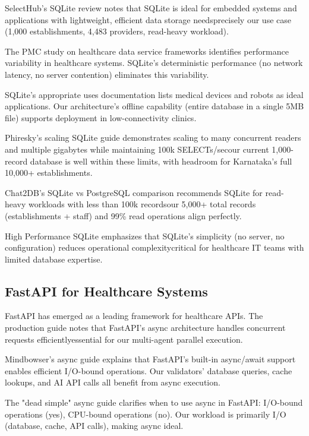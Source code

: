 \documentclass[conference]{IEEEtran}
\begin{document}
SelectHub's SQLite review \cite{selecthub2024sqlite} notes that SQLite is ideal for embedded systems and applications with lightweight, efficient data storage needsprecisely our use case (1,000 establishments, 4,483 providers, read-heavy workload).

The PMC study on healthcare data service frameworks \cite{pmc2019healthcare} identifies performance variability in healthcare systems. SQLite's deterministic performance (no network latency, no server contention) eliminates this variability.

SQLite's appropriate uses documentation \cite{sqlite2024uses} lists medical devices and robots as ideal applications. Our architecture's offline capability (entire database in a single 5MB file) supports deployment in low-connectivity clinics.

Phiresky's scaling SQLite guide \cite{phiresky2020sqlite} demonstrates scaling to many concurrent readers and multiple gigabytes while maintaining 100k SELECTs/secour current 1,000-record database is well within these limits, with headroom for Karnataka's full 10,000+ establishments.

Chat2DB's SQLite vs PostgreSQL comparison \cite{chat2db2024sqlite} recommends SQLite for read-heavy workloads with less than 100k recordsour 5,000+ total records (establishments + staff) and 99\% read operations align perfectly.

High Performance SQLite \cite{highperformancesqlite2024} emphasizes that SQLite's simplicity (no server, no configuration) reduces operational complexitycritical for healthcare IT teams with limited database expertise.

\subsection{FastAPI for Healthcare Systems}

FastAPI has emerged as a leading framework for healthcare APIs. The production guide \cite{slashdev2024fastapi} notes that FastAPI's async architecture handles concurrent requests efficientlyessential for our multi-agent parallel execution.

Mindbowser's async guide \cite{mindbowser2024async} explains that FastAPI's built-in async/await support enables efficient I/O-bound operations. Our validators' database queries, cache lookups, and AI API calls all benefit from async execution.

The "dead simple" async guide \cite{medium2024async} clarifies when to use async in FastAPI: I/O-bound operations (yes), CPU-bound operations (no). Our workload is primarily I/O (database, cache, API calls), making async ideal.
\end{document}
